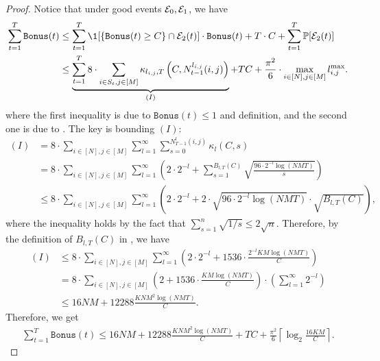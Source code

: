 \begin{lemma}
\begin{proof}
Notice that under good events ${\mathcal{E}}_0, {\mathcal{E}}_1$, we have
\begin{align*}
    \sum_{t=1}^T \texttt{Bonus}(t) &\le \sum_{t=1}^T \1[\{\texttt{Bonus}(t) \ge C\} \cap \gE_2(t)]\cdot \texttt{Bonus}(t) + T \cdot C + \sum_{t=1}^T \Prob[\gE_2(t)] \\
    &\le \underbrace{\sum_{t=1}^T 8 \cdot \sum_{i\in S_t, j \in [M]} \kappa_{l_{i,j}, T}\left(C, N_{t-1}^{l_{i,j}}(i,j)\right)}_{(I)} + TC + \frac{\pi^2}{6} \cdot \max_{i\in [N], j \in [M]} l_{i,j}^{\max} .
\end{align*}
where the first inequality is due to $\texttt{Bonus}(t) \le 1$ and definition, and the second one is due to . The key is bounding $(I)$:
\begin{align*}
    (I) &= 8\cdot \sum_{i \in [N], j \in [M]} \sum_{l=1}^\infty \sum_{s=0}^{N_{T-1}^{l}(i,j)}\kappa_{l}(C, s) \\
    &= 8 \cdot \sum_{i \in [N], j \in [M]} \sum_{l=1}^\infty \left(2\cdot 2^{-l} +  \sum_{s=1}^{B_{l,T}(C)}\sqrt{\frac{96 \cdot 2^{-l} \log(NMT)}{ s }} \right) \\
    &\le 8\cdot  \sum_{i \in [N], j \in [M]} \sum_{l=1}^\infty \left(2\cdot 2^{-l} +  2\cdot \sqrt{96 \cdot 2^{-l} \log(NMT)}\cdot \sqrt{B_{l,T}(C)} \right) ,
\end{align*}
where the inequality holds by the fact that $\sum_{s=1}^n \sqrt{1/s} \le 2\sqrt{n}$. Therefore, by the definition of $B_{l,T}(C)$ in , we have
\begin{align*}
    (I) &\le  8\cdot  \sum_{i \in [N], j \in [M]} \sum_{l=1}^\infty \left(2\cdot 2^{-l} +  1536\cdot \frac{2^{-l}KM\log(NMT)}{C} \right) \\
    &= 8\cdot  \sum_{i \in [N], j \in [M]}  \left(2+  1536\cdot \frac{KM\log(NMT)}{C} \right)\cdot \left(\sum_{l=1}^\infty 2^{-l}\right) \\
    &\le 16NM + 12288\frac{KNM^2\log(NMT)}{C}.
\end{align*}
Therefore, we get
\begin{align*}
    \sum_{t=1}^T \texttt{Bonus}(t) \le 16NM + 12288\frac{KNM^2\log(NMT)}{C} + TC + \frac{\pi^2}{6} \left\lceil \log_2\frac{16KM}{C} \right\rceil.
\end{align*}
\end{proof}
\end{lemma}



